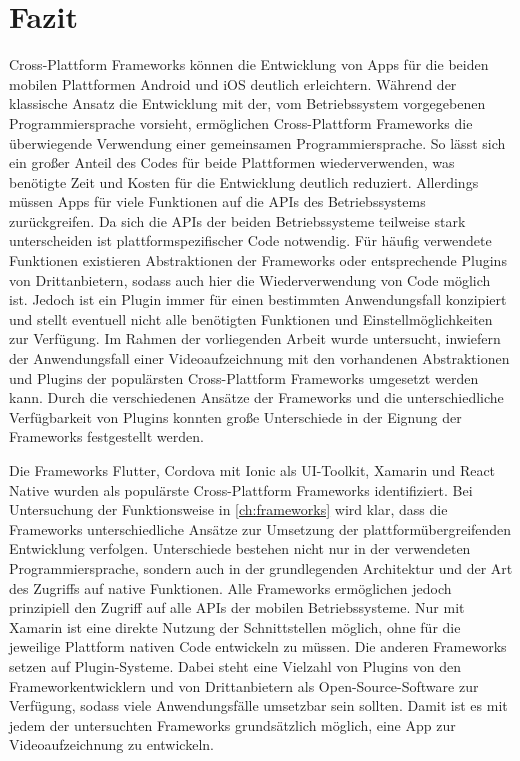 \chapter{Fazit}
\label{ch:fazit}


Cross-Plattform Frameworks können die Entwicklung von Apps für die beiden mobilen Plattformen Android und iOS deutlich erleichtern.
Während der klassische Ansatz die Entwicklung mit der, vom Betriebssystem vorgegebenen Programmiersprache vorsieht, ermöglichen Cross-Plattform Frameworks die überwiegende Verwendung einer gemeinsamen Programmiersprache.
So lässt sich ein großer Anteil des Codes für beide Plattformen wiederverwenden, was benötigte Zeit und Kosten für die Entwicklung deutlich reduziert.
Allerdings müssen Apps für viele Funktionen auf die \acp{API} des Betriebssystems zurückgreifen.
Da sich die \acp{API} der beiden Betriebssysteme teilweise stark unterscheiden ist plattformspezifischer Code notwendig.
Für häufig verwendete Funktionen existieren Abstraktionen der Frameworks oder entsprechende Plugins von Drittanbietern, sodass auch hier die Wiederverwendung von Code möglich ist.
Jedoch ist ein Plugin immer für einen bestimmten Anwendungsfall konzipiert und stellt eventuell nicht alle benötigten Funktionen und Einstellmöglichkeiten zur Verfügung.
Im Rahmen der vorliegenden Arbeit wurde untersucht, inwiefern der Anwendungsfall einer Videoaufzeichnung mit den vorhandenen Abstraktionen und Plugins der populärsten Cross-Plattform Frameworks umgesetzt werden kann.
Durch die verschiedenen Ansätze der Frameworks und die unterschiedliche Verfügbarkeit von Plugins konnten große Unterschiede in der Eignung der Frameworks festgestellt werden.


Die Frameworks Flutter, Cordova mit Ionic als UI-Toolkit, Xamarin und React Native wurden als populärste Cross-Plattform Frameworks identifiziert.
Bei Untersuchung der Funktionsweise in \autoref{ch:frameworks} wird klar, dass die Frameworks unterschiedliche Ansätze zur Umsetzung der plattformübergreifenden Entwicklung verfolgen.
Unterschiede bestehen nicht nur in der verwendeten Programmiersprache, sondern auch in der grundlegenden Architektur und der Art des Zugriffs auf native Funktionen.
Alle Frameworks ermöglichen jedoch prinzipiell den Zugriff auf alle \acp{API} der mobilen Betriebssysteme.
Nur mit Xamarin ist eine direkte Nutzung der Schnittstellen möglich, ohne für die jeweilige Plattform nativen Code entwickeln zu müssen.
Die anderen Frameworks setzen auf Plugin-Systeme.
Dabei steht eine Vielzahl von Plugins von den Frameworkentwicklern und von Drittanbietern als Open-Source-Software zur Verfügung, sodass viele Anwendungsfälle umsetzbar sein sollten.
Damit ist es mit jedem der untersuchten Frameworks grundsätzlich möglich, eine App zur Videoaufzeichnung zu entwickeln.


